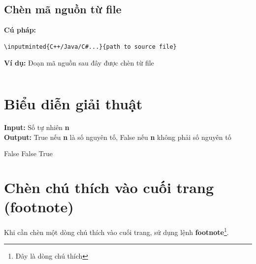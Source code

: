 \subsection{Chèn mã nguồn từ file}
\noindent\textbf{Cú pháp:} 
\begin{verbatim}
\inputminted{C++/Java/C#...}{path to source file}
\end{verbatim}
\noindent\textbf{Ví dụ:} Đoạn mã nguồn sau đây được chèn từ file 

\inputminted{c++}{code/XulyFileText.cpp}
\section{Biểu diễn giải thuật}
    \begin{algorithm}[H]
    \caption{Kiểm tra một số tự nhiên có phải số nguyên tố hay không}\label{prime_number_check}
    \hspace*{\algorithmicindent} \textbf{Input:} 
    Số tự nhiên \textbf{n}\\
    \hspace*{\algorithmicindent} \textbf{Output:} 
    True nếu \textbf{n} là số nguyên tố,
    False nếu \textbf{n} không phải số nguyên tố
    \begin{algorithmic}[1]
     \Return False
    \EndIf
     \Return False
    \EndIf
    \EndFor
    \State \Return True
    \EndFunction
    \end{algorithmic}
    \end{algorithm}


\section{Chèn chú thích vào cuối trang (footnote)}
Khi cần chèn một dòng chú thích vào cuối trang, sử dụng lệnh \textbf{footnote}\footnote{Đây là dòng chú thích}.




